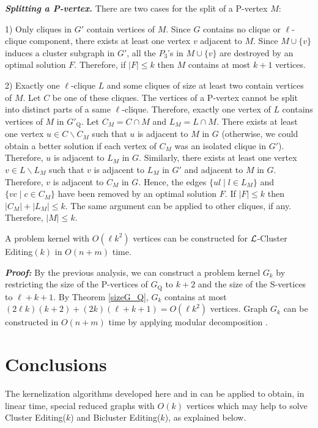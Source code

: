 \documentclass[12pt]{article}
\def\L{{\cal L}}
\begin{document}
\emph{\textbf{Splitting a P-vertex.}} There are two cases for
the split of a P-vertex $M$:

1) Only cliques in $G'$ contain vertices of $M$. Since $G$
contains no clique or $\ell$-clique component, there exists at
least one vertex $v$ adjacent to $M$. Since $M \cup \{v\}$ induces
a cluster subgraph in $G'$, all the $P_3$'s in $M \cup \{v\}$ are
destroyed by an optimal solution $F$. Therefore, if $|F|\leq k$ then $M$ contains at most $k+1$ vertices.

2) Exactly one $\ell$-clique $L$ and some cliques of size at least
two contain vertices of $M$. Let $C$ be one of these cliques. The
vertices of a P-vertex cannot be split into distinct parts of a
same $\ell$-clique. Therefore, exactly one vertex of $L$ contains
vertices of $M$ in $G'_{\mathrm Q}$. Let $C_M = C \cap M$ and $L_M
= L \cap M$. There exists at least one vertex $u \in C\backslash
C_M$ such that $u$ is adjacent to $M$ in $G$ (otherwise, we could
obtain a better solution if each vertex of $C_M$ was an isolated
clique in $G'$). Therefore, $u$ is adjacent to $L_M$ in $G$.
Similarly, there exists at least one vertex $v \in L\backslash
L_M$ such that $v$ is adjacent to $L_M$ in $G'$ and adjacent to
$M$ in $G$. Therefore, $v$ is adjacent to $C_M$ in $G$. Hence, the
edges $\{ul \mid l \in L_M\}$ and $\{vc \mid c \in C_M\}$
have been removed by an optimal solution $F$. If $|F|\leq k$ then
$|C_M|+|L_M|\leq k$. The same argument can be applied to other
cliques, if any. Therefore, $|M|\leq k$.


\begin{teo}
A problem kernel with $O(\ell k^2)$ vertices can be constructed
for $\L${\sc -Cluster Editing$(k)$} in $O(n+m)$ time.
\end{teo}

\emph{\textbf{Proof:}} By the previous analysis, we can construct
a problem kernel $G_k$ by restricting the size of the P-vertices
of $G_{\mathrm Q}$ to $k+2$ and the size of the S-vertices to
$\ell+k+1$. By Theorem \ref{sizeG_Q}, $G_k$ contains at most
$(2\ell k)(k+2)+(2k)(\ell +k +1) = O(\ell k^2)$ vertices. Graph $G_k$
can be constructed in $O(n+m)$ time by applying modular
decomposition \cite{DSPS2006,DSPS2009}. \hfill \framebox[.09in]


\section{Conclusions} \label{sec5}

The kernelization algorithms developed here and in \cite{DSPS2006,DSPS2009} can be applied to obtain, in linear time, special reduced graphs with $O(k)$ vertices which may help to solve {\sc Cluster Editing($k$)} and {\sc Bicluster Editing($k$)}, as explained below.
\end{document}

